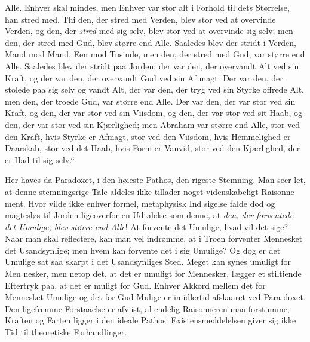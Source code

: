 \documentclass[12pt]{book}
\newcommand{\opage}[1]{\marginnote{\footnotesize\textit{[#1]}}}
\begin{document}
Alle. Enhver skal mindes, men Enhver var stor alt
i Forhold til dets Størrelse, han stred med. Thi den,
der stred med Verden, blev stor ved at overvinde
Verden, og den, der \emph{stred} med sig selv, blev stor
ved at overvinde sig selv; men den, der stred med Gud,
blev større end Alle. Saaledes blev der stridt i Verden,
Mand mod Mand, Een mod Tusinde, men den, der stred
med Gud, var større end Alle. Saaledes blev der stridt
paa Jorden: der var den, der overvandt Alt ved sin
Kraft, og der var den, der overvandt Gud ved sin Af\-%
magt. Der var den, der stolede paa sig selv og vandt
Alt, der var den, der tryg ved sin Styrke offrede Alt,
men den, der troede Gud, var større end Alle. Der var
den, der var stor ved sin Kraft, og den, der var stor ved
sin Viisdom, og den, der var stor ved sit Haab, og den, der
var stor ved sin Kjærlighed; men Abraham var større end
Alle, stor ved den Kraft, hvis Styrke er Afmagt, stor ved
den Viisdom, hvis Hemmelighed er Daarskab, stor ved det
Haab, hvis Form er Vanvid, stor ved den Kjærlighed,
der er Had til sig selv.“

Her haves da Paradoxet, i den høieste Pathos, den
rigeste Stemning. Man seer let, at denne stemningsrige
Tale aldeles ikke tillader noget videnskabeligt Raisonne\-%
ment. Hvor vilde ikke enhver formel, metaphysisk Ind\-%
sigelse falde død og magtesløs til Jorden ligeoverfor
en Udtalelse som denne, at \emph{den, der forventede det
Umulige, blev større end Alle}! At forvente det
Umulige, hvad vil det sige? Naar man skal reflectere,
kan man vel indrømme, at i Troen forventer Mennesket
det Usandsynlige; men hvem kan forvente det i sig
\opage{233}\setcounter{footnote}{0}%
Umulige? Og dog er det Umulige sat saa skarpt i det
Usandsynliges Sted. Meget kan synes umuligt for Men\-%
nesker, men netop det, at det er umuligt for Mennesker,
lægger et stiltiende Eftertryk paa, at det er muligt for
Gud. Enhver Akkord mellem det for Mennesket Umulige
og det for Gud Mulige er imidlertid afskaaret ved Para\-%
doxet. Den ligefremme Forstaaelse er afviist, al endelig
Raisonneren maa forstumme; Kraften og Farten ligger i
den ideale Pathos: Existensmeddelelsen giver sig ikke
Tid til theoretiske Forhandlinger.
\end{document}
